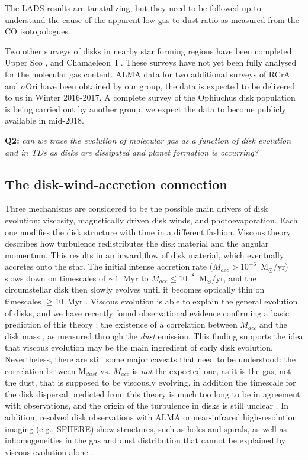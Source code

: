 \documentclass[10pt,fleqn,twoside]{article}
\begin{document}
The LADS results are tanatalizing, but they need to be followed up to understand the cause of the apparent low gas-to-dust ratio as measured from the CO isotopologues.

Two other surveys of disks in nearby star forming regions have been completed: Upper Sco \citep{2016ApJ...827..142B}, and Chamaeleon~I \citep{2016ApJ...831..125P}. These surveys have not yet been fully analysed for the molecular gas content. ALMA data for two additional surveys of RCrA and $\sigma$Ori have been obtained by our group, the data is expected to be delivered to us in Winter 2016-2017. A complete survey of the Ophiuchus disk population is being carried out by another group, we expect the data to become publicly available in mid-2018.

\smallskip
{\bf Q2:} {\it can we trace the evolution of molecular gas as a function of disk evolution and in TDs as disks are dissipated and planet formation is occurring?}

\subsection{The disk-wind-accretion connection}

Three mechanisms are considered to be the possible main drivers of disk evolution: viscosity,
magnetically driven disk winds, and photoevaporation. Each one modifies the disk structure with 
time in a different fashion. Viscous theory \citep[e.g.\ ][]{1974MNRAS.168..603L} describes how
turbulence redistributes the disk material and the angular momentum. This results in an inward 
flow of disk material, which eventually accretes onto the star. The initial intense accretion 
rate ($M_{acc}>10^{-6}$~M$_\odot$/yr)
slows down on timescales of $\sim 1$~Myr to $M_{acc}\le 10^{-8}$~M$_\odot$/yr,
and the circumstellar disk then slowly evolves until it 
becomes optically thin on timescales $\ge$10~Myr \citep[e.g.\ ][]{1998apsf.book.....H, 2011MNRAS.410..671E}. Viscous 
evolution is able to explain the general evolution of disks, and we have recently found observational
evidence confirming a basic prediction of this theory \citep[e.g.\ ][]{2006ApJ...645L..69D}: the existence of a correlation between $M_{acc}$ 
and the disk mass \citep{2016A&A...591L...3M}, as measured through the {\it dust} emission. This 
finding supports the idea that viscous evolution may be the main ingredient of early disk evolution.
Nevertheless, there are still some major caveats that need to be understood:
the correlation between  M$_{dust}$ vs. $M_{acc}$ is {\it not} the expected one, as it is the gas,
not the dust, that is supposed to be viscously evolving, in addition
the timescale for the disk dispersal predicted from this theory is much too long to be in agreement with 
observations, and the origin of the turbulence in disks is still unclear 
\citep[e.g.\ ][]{2014prpl.conf..411T}. In addition, resolved disk observations with ALMA or 
near-infrared high-resolution imaging (e.g., SPHERE) show structures, such as holes and 
spirals, as well as inhomogeneities in the gas and dust distribution that cannot be 
explained by viscous evolution alone \citep[e.g.\ ][]{2015A&A...578L...6B}. 
\end{document}
